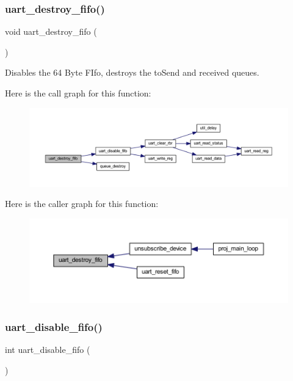 \subsubsection{\texorpdfstring{uart\+\_\+destroy\+\_\+fifo()}{uart\_destroy\_fifo()}}
{\footnotesize\ttfamily void uart\+\_\+destroy\+\_\+fifo (\begin{DoxyParamCaption}{ }\end{DoxyParamCaption})}



Disables the 64 Byte F\+Ifo, destroys the to\+Send and received queues. 

Here is the call graph for this function\+:\nopagebreak
\begin{figure}[H]
\begin{center}
\leavevmode
\includegraphics[width=350pt]{group__uart_ga5eb3f3881ed8e1ff240400ecc1c7d20c_cgraph}
\end{center}
\end{figure}
Here is the caller graph for this function\+:\nopagebreak
\begin{figure}[H]
\begin{center}
\leavevmode
\includegraphics[width=350pt]{group__uart_ga5eb3f3881ed8e1ff240400ecc1c7d20c_icgraph}
\end{center}
\end{figure}
\mbox{\label{group__uart_gaab82e10e73e8b9986637482bc794f33e}} 
\subsubsection{\texorpdfstring{uart\+\_\+disable\+\_\+fifo()}{uart\_disable\_fifo()}}
{\footnotesize\ttfamily int uart\+\_\+disable\+\_\+fifo (\begin{DoxyParamCaption}{ }\end{DoxyParamCaption})}



